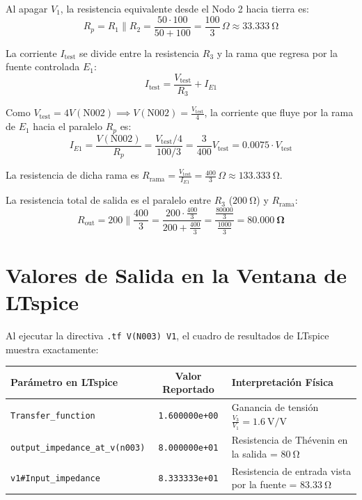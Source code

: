 \documentclass[11pt, a4paper]{article}
\begin{document}
Al apagar $V_1$, la resistencia equivalente desde el Nodo 2 hacia tierra es:
\begin{equation*}
    R_p = R_1 \parallel R_2 = \frac{50 \cdot 100}{50 + 100} = \frac{100}{3}\,\Omega \approx \qty{33.333}{\ohm}
\end{equation*}

La corriente $I_{\text{test}}$ se divide entre la resistencia $R_3$ y la rama que regresa por la fuente controlada $E_1$:
\begin{equation*}
    I_{\text{test}} = \frac{V_{\text{test}}}{R_3} + I_{E1}
\end{equation*}

Como $V_{\text{test}} = 4 V(\text{N002}) \implies V(\text{N002}) = \frac{V_{\text{test}}}{4}$, la corriente que fluye por la rama de $E_1$ hacia el paralelo $R_p$ es:
\begin{equation*}
    I_{E1} = \frac{V(\text{N002})}{R_p} = \frac{V_{\text{test}} / 4}{100 / 3} = \frac{3}{400} V_{\text{test}} = 0.0075 \cdot V_{\text{test}}
\end{equation*}

La resistencia de dicha rama es $R_{\text{rama}} = \frac{V_{\text{test}}}{I_{E1}} = \frac{400}{3}\,\Omega \approx \qty{133.333}{\ohm}$.

La resistencia total de salida es el paralelo entre $R_3$ ($\qty{200}{\ohm}$) y $R_{\text{rama}}$:
\begin{equation*}
    R_{\text{out}} = 200 \parallel \frac{400}{3} = \frac{200 \cdot \frac{400}{3}}{200 + \frac{400}{3}} = \frac{\frac{80000}{3}}{\frac{1000}{3}} = \mathbf{\qty{80.000}{\ohm}}
\end{equation*}

\vspace{0.4cm}
\section*{Valores de Salida en la Ventana de LTspice}
Al ejecutar la directiva \texttt{.tf V(N003) V1}, el cuadro de resultados de LTspice muestra exactamente:

\vspace{0.2cm}
\begin{table}[h!]
    \centering
    \renewcommand{\arraystretch}{1.5}
    \begin{tabularx}{\textwidth}{@{}l c X@{}}
        \toprule
        \rowcolor{ucbblue!10}
        \textbf{Parámetro en LTspice} & \textbf{Valor Reportado} & \textbf{Interpretación Física} \\
        \midrule
        \texttt{Transfer\_function} & \texttt{1.600000e+00} & Ganancia de tensión $\frac{V_3}{V_1} = \qty{1.6}{\volt\per\volt}$ \\
        \texttt{output\_impedance\_at\_v(n003)} & \texttt{8.000000e+01} & Resistencia de Thévenin en la salida = $\qty{80}{\ohm}$ \\
        \texttt{v1\#Input\_impedance} & \texttt{8.333333e+01} & Resistencia de entrada vista por la fuente = $\qty{83.33}{\ohm}$ \\
        \bottomrule
    \end{tabularx}
\end{table}

\vspace{0.4cm}
\end{document}
